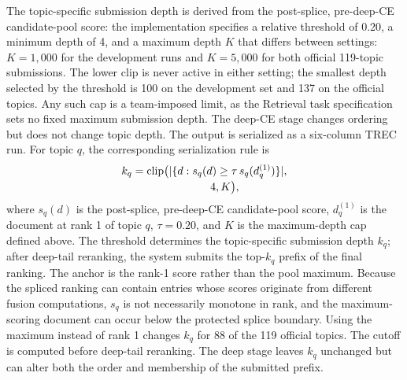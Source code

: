 The topic-specific submission depth is derived from the post-splice,
pre-deep-CE candidate-pool score: the implementation specifies a relative threshold of
0.20, a minimum depth of 4, and a maximum depth $K$ that differs
between settings: $K=1{,}000$ for the development runs and $K=5{,}000$
for both official 119-topic submissions. The lower clip is never
active in either setting; the smallest depth selected by the threshold
is 100 on the development set and 137 on the official topics. Any such
cap is a team-imposed limit, as the Retrieval task specification sets
no fixed maximum submission depth. The deep-CE
stage changes ordering but does not change topic depth. The output is
serialized as a six-column TREC run. For topic $q$, the corresponding
serialization rule is
\begin{equation}
\begin{aligned}
k_q &= \operatorname{clip}\bigl(
\lvert\{d : s_q(d) \geq \tau\, s_q(d_q^{(1)})\}\rvert,\\[-2pt]
&\hspace{25mm}4, K\bigr),
\end{aligned}
\label{eq:vark}
\end{equation}
where $s_q(d)$ is the post-splice, pre-deep-CE candidate-pool score,
$d_q^{(1)}$ is the document at rank 1 of topic $q$, $\tau=0.20$, and
$K$ is the maximum-depth cap defined above.
The threshold determines the topic-specific submission depth $k_q$;
after deep-tail reranking, the system submits the top-$k_q$ prefix of
the final ranking.
The anchor is the rank-1 score rather than the pool maximum. Because
the spliced ranking can contain entries whose scores originate from
different fusion computations, $s_q$ is not necessarily monotone in
rank, and the maximum-scoring document can occur below the protected
splice boundary. Using the
maximum instead of rank 1 changes $k_q$ for 88 of the 119 official
topics. The cutoff is computed before deep-tail reranking. The deep
stage leaves $k_q$ unchanged but can alter both the order and
membership of the submitted prefix.
